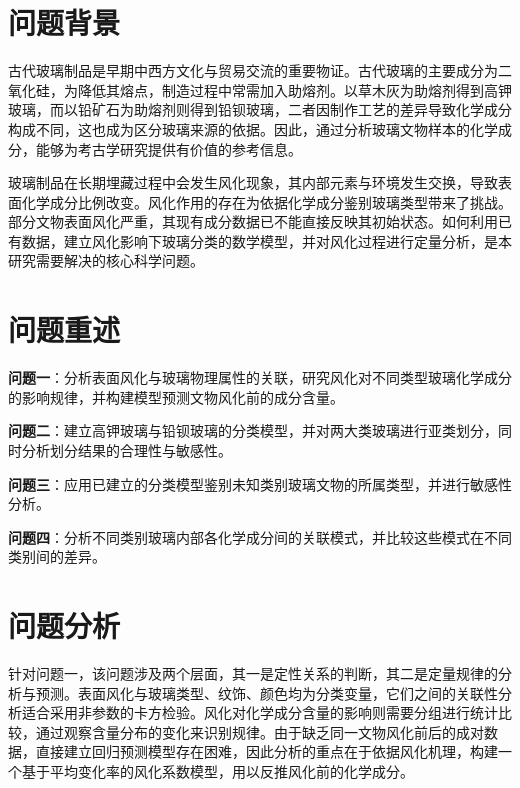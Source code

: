 \section{问题背景}

古代玻璃制品是早期中西方文化与贸易交流的重要物证。古代玻璃的主要成分为二氧化硅，为降低其熔点，制造过程中常需加入助熔剂。以草木灰为助熔剂得到高钾玻璃，而以铅矿石为助熔剂则得到铅钡玻璃，二者因制作工艺的差异导致化学成分构成不同，这也成为区分玻璃来源的依据。因此，通过分析玻璃文物样本的化学成分，能够为考古学研究提供有价值的参考信息。

玻璃制品在长期埋藏过程中会发生风化现象，其内部元素与环境发生交换，导致表面化学成分比例改变。风化作用的存在为依据化学成分鉴别玻璃类型带来了挑战。部分文物表面风化严重，其现有成分数据已不能直接反映其初始状态。如何利用已有数据，建立风化影响下玻璃分类的数学模型，并对风化过程进行定量分析，是本研究需要解决的核心科学问题。




\section{问题重述}

\textbf{问题一}：分析表面风化与玻璃物理属性的关联，研究风化对不同类型玻璃化学成分的影响规律，并构建模型预测文物风化前的成分含量。

\textbf{问题二}：建立高钾玻璃与铅钡玻璃的分类模型，并对两大类玻璃进行亚类划分，同时分析划分结果的合理性与敏感性。

\textbf{问题三}：应用已建立的分类模型鉴别未知类别玻璃文物的所属类型，并进行敏感性分析。

\textbf{问题四}：分析不同类别玻璃内部各化学成分间的关联模式，并比较这些模式在不同类别间的差异。

\section{问题分析}

针对问题一，该问题涉及两个层面，其一是定性关系的判断，其二是定量规律的分析与预测。表面风化与玻璃类型、纹饰、颜色均为分类变量，它们之间的关联性分析适合采用非参数的卡方检验。风化对化学成分含量的影响则需要分组进行统计比较，通过观察含量分布的变化来识别规律。由于缺乏同一文物风化前后的成对数据，直接建立回归预测模型存在困难，因此分析的重点在于依据风化机理，构建一个基于平均变化率的风化系数模型，用以反推风化前的化学成分。

